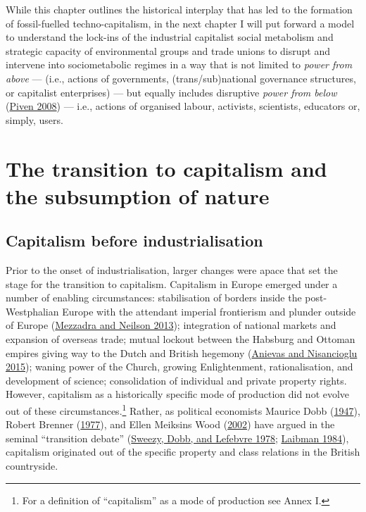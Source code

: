 \documentclass[a4paper, nobind]{templates/ociamthesis}
\begin{document}
While this chapter outlines the historical interplay that has led to the formation of fossil-fuelled techno-capitalism, in the next chapter I will put forward a model to understand the lock-ins of the industrial capitalist social metabolism and strategic capacity of environmental groups and trade unions to disrupt and intervene into sociometabolic regimes in a way that is not limited to \emph{power from above} --- (i.e., actions of governments, (trans/sub)national governance structures, or capitalist enterprises) --- but equally includes disruptive \emph{power from below} (\protect\hyperlink{ref-piven_can_2008}{Piven 2008}) --- i.e., actions of organised labour, activists, scientists, educators or, simply, users.

\hypertarget{the-transition-to-capitalism-and-the-subsumption-of-nature}{%
\section{The transition to capitalism and the subsumption of nature}\label{the-transition-to-capitalism-and-the-subsumption-of-nature}}

\hypertarget{capitalism-before-industrialisation}{%
\subsection{Capitalism before industrialisation}\label{capitalism-before-industrialisation}}

Prior to the onset of industrialisation, larger changes were apace that set the stage for the transition to capitalism. Capitalism in Europe emerged under a number of enabling circumstances: stabilisation of borders inside the post-Westphalian Europe with the attendant imperial frontierism and plunder outside of Europe (\protect\hyperlink{ref-mezzadra_border_2013}{Mezzadra and Neilson 2013}); integration of national markets and expansion of overseas trade; mutual lockout between the Habsburg and Ottoman empires giving way to the Dutch and British hegemony (\protect\hyperlink{ref-anievas_how_2015}{Anievas and Nisancioglu 2015}); waning power of the Church, growing Enlightenment, rationalisation, and development of science; consolidation of individual and private property rights. However, capitalism as a historically specific mode of production did not evolve out of these circumstances.\footnote{For a definition of ``capitalism'' as a mode of production see Annex I.} Rather, as political economists Maurice Dobb (\protect\hyperlink{ref-dobb_studies_1947}{1947}), Robert Brenner (\protect\hyperlink{ref-brenner_origins_1977}{1977}), and Ellen Meiksins Wood (\protect\hyperlink{ref-meiksins_wood_origin_2002}{2002}) have argued in the seminal ``transition debate'' (\protect\hyperlink{ref-sweezy_transition_1978}{Sweezy, Dobb, and Lefebvre 1978}; \protect\hyperlink{ref-laibman_modes_1984}{Laibman 1984}), capitalism originated out of the specific property and class relations in the British countryside.
\end{document}
